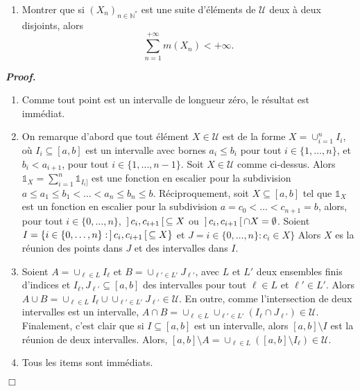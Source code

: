 \documentclass[11pt,a4paper]{article}
\newcommand{\NN}{\mathbb{N}}
\newenvironment{preuve}[1][]
{\vskip 2mm  \noindent\emph{\bf Proof#1. }}{$\Box$ \vskip 2mm}
\let\leq\leqslant
\begin{document}
\begin{enumerate}
	\item Montrer que si $(X_n)_{n\in \NN^{*}}$ est une suite  d'éléments de $\mathcal{U}$ deux à deux disjoints, alors 
	\[     \sum_{n=1}^{+\infty}m(X_n)<+\infty.     \]
\end{enumerate}

\begin{preuve}
	\begin{enumerate}
		\item Comme tout point est un intervalle de longueur zéro, le résultat est immédiat. 
		\item On remarque d'abord que tout élément $X \in \mathcal{U}$ est de la forme $X = \cup_{i=1}^{n} I_{i}$, où $I_{i} \subseteq [a,b]$ est un intervalle avec bornes $a_{i} \leq b_{i}$ pour tout $i \in \{ 1 , \dots , n \}$, et $b_{i} < a_{i+1}$, pour tout $i \in \{ 1 , \dots , n - 1 \}$. 
		Soit $X \in \mathcal{U}$ comme ci-dessus. 
		Alors $\mathbb{1}_X = \sum_{i=1}^{n} \mathbb{1}_{I_{i}]}$ est une fonction en escalier pour la subdivision $a \leq a_{1} \leq b_{1} < \dots < a_{n} \leq b_{n} \leq b$. 
		Réciproquement, soit $X \subseteq [a,b]$ tel que $\mathbb{1}_X$ est un fonction en escalier pour la subdivision $a = c_{0} < \dots < c_{n+1}=b$, alors, pour tout $i \in \{0, \dots, n\}$, $\hskip 0.6mm] \hskip 0.6mm c_{i}, c_{i+1} \hskip 0.6mm [ \hskip 0.6mm \subseteq X$ ou $\hskip 0.6mm] \hskip 0.6mm c_{i}, c_{i+1} \hskip 0.6mm [ \hskip 0.6mm \cap X = \emptyset$. 
		Soient $I = \{ i \in \{0, \dots, n\} : \hskip 0.6mm] \hskip 0.6mmc_{i}, c_{i+1} \hskip 0.6mm [ \hskip 0.6mm \subseteq X \}$ et $J = i \in \{0, \dots, n\} : c_{i} \in X \}$
		Alors $X$ es la réunion des points dans $J$ et des intervalles dans $I$. 
		
		\item Soient $A = \cup_{\ell \in L} I_{\ell}$ et $B = \cup_{\ell' \in L'} J_{\ell'}$, avec $L$ et $L'$ deux ensembles finis d'indices et 
		$I_{\ell}, J_{\ell'} \subseteq [a,b]$ des intervalles pour tout $\ell \in L$ et $\ell' \in L'$. 
		Alors $A\cup B = \cup_{\ell \in L} I_{\ell} \cup \cup_{\ell' \in L'} J_{\ell'} \in \mathcal{U}$. 
		En outre, comme l'intersection de deux intervalles est un intervalle,
		$A\cap B = \cup_{\ell \in L} \cup_{\ell' \in L'} (I_{\ell} \cap J_{\ell'})\in \mathcal{U}$. 
		Finalement, c'est clair que si $I \subseteq [a,b]$ est un intervalle, alors $[a,b]\setminus I$ est la réunion de deux intervalles. 
		Alors, $[a,b]\setminus A = \cup_{\ell \in L} ([a,b] \setminus I_{\ell}) \in \mathcal{U}$.
		
		\item Tous les items sont immédiats. 
		

\end{enumerate}
\end{preuve}
\end{document}

